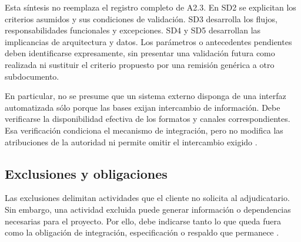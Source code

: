 Esta síntesis no reemplaza el registro completo de A2.3. En SD2 se explicitan los criterios asumidos y sus condiciones de validación. SD3 desarrolla los flujos, responsabilidades funcionales y excepciones. SD4 y SD5 desarrollan las implicancias de arquitectura y datos. Los parámetros o antecedentes pendientes deben identificarse expresamente, sin presentar una validación futura como realizada ni sustituir el criterio propuesto por una remisión genérica a otro subdocumento.

En particular, no se presume que un sistema externo disponga de una interfaz automatizada sólo porque las bases exijan intercambio de información. Debe verificarse la disponibilidad efectiva de los formatos y canales correspondientes. Esa verificación condiciona el mecanismo de integración, pero no modifica las atribuciones de la autoridad ni permite omitir el intercambio exigido \parencite[cap.~15, RT-05.23, p.~34]{pucv-caso07-2026}.

\subsection{Exclusiones y obligaciones} %

Las exclusiones delimitan actividades que el cliente no solicita al adjudicatario. Sin embargo, una actividad excluida puede generar información o dependencias necesarias para el proyecto. Por ello, debe indicarse tanto lo que queda fuera como la obligación de integración, especificación o respaldo que permanece \parencite[cap.~11, pp.~26-27]{pucv-caso07-2026}.

